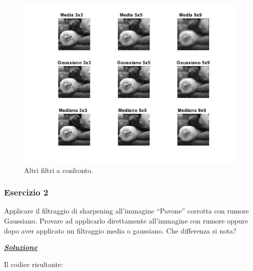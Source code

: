 \documentclass[a4paper]{article}
\newcommand{\dquotes}[1]{``#1''}
\begin{document}
	\begin{figure}[!htp]
		\centering
		\includegraphics[width=\textwidth]{img/lab/operato-locali-6.jpg}
		\caption{Altri filtri a confronto.}
	\end{figure}\newpage
	
	\subsubsection{Esercizio 2}
	
	Applicare il filtraggio di sharpening all'immagine \dquotes{Pavone} corrotta con rumore Gaussiano. Provare ad applicarlo direttamente all'immagine con rumore oppure dopo aver applicato un filtraggio media o gaussiano. Che differenza si nota?\newline
	
	\noindent
	\textcolor{Green4}{\textbf{\emph{\underline{Soluzione}}}}\newline
	
	\noindent
	Il codice risultante:
	\newpage
	
\end{document}

